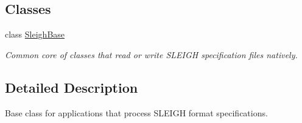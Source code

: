 \subsection*{Classes}
\begin{DoxyCompactItemize}
\item 
class \mbox{\hyperlink{class_sleigh_base}{Sleigh\+Base}}
\begin{DoxyCompactList}\small\item\em Common core of classes that read or write S\+L\+E\+I\+GH specification files natively. \end{DoxyCompactList}\end{DoxyCompactItemize}


\subsection{Detailed Description}
Base class for applications that process S\+L\+E\+I\+GH format specifications. 

